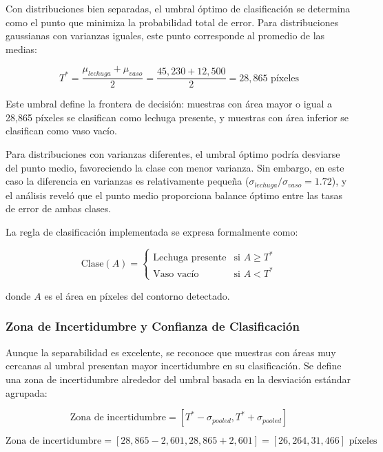 Con distribuciones bien separadas, el umbral óptimo de clasificación se determina como el punto que minimiza la probabilidad total de error. Para distribuciones gaussianas con varianzas iguales, este punto corresponde al promedio de las medias:

\begin{equation}
T^* = \frac{\mu_{lechuga} + \mu_{vaso}}{2} = \frac{45,230 + 12,500}{2} = 28,865 \text{ píxeles}
\end{equation}

Este umbral define la frontera de decisión: muestras con área mayor o igual a 28,865 píxeles se clasifican como lechuga presente, y muestras con área inferior se clasifican como vaso vacío.

Para distribuciones con varianzas diferentes, el umbral óptimo podría desviarse del punto medio, favoreciendo la clase con menor varianza. Sin embargo, en este caso la diferencia en varianzas es relativamente pequeña ($\sigma_{lechuga}/\sigma_{vaso} = 1.72$), y el análisis reveló que el punto medio proporciona balance óptimo entre las tasas de error de ambas clases.

La regla de clasificación implementada se expresa formalmente como:

\begin{equation}
\text{Clase}(A) = \begin{cases}
\text{Lechuga presente} & \text{si } A \geq T^* \\
\text{Vaso vacío} & \text{si } A < T^*
\end{cases}
\end{equation}

donde $A$ es el área en píxeles del contorno detectado.

\subsubsection{Zona de Incertidumbre y Confianza de Clasificación}

Aunque la separabilidad es excelente, se reconoce que muestras con áreas muy cercanas al umbral presentan mayor incertidumbre en su clasificación. Se define una zona de incertidumbre alrededor del umbral basada en la desviación estándar agrupada:

\begin{equation}
\text{Zona de incertidumbre} = [T^* - \sigma_{pooled}, T^* + \sigma_{pooled}]
\end{equation}

\begin{equation}
\text{Zona de incertidumbre} = [28,865 - 2,601, 28,865 + 2,601] = [26,264, 31,466] \text{ píxeles}
\end{equation}

